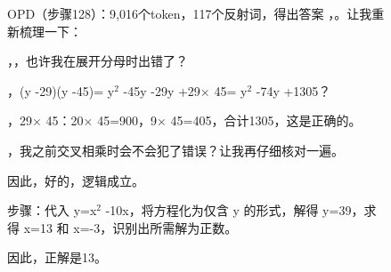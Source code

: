 \begin{figure}[p]
\begin{minipage}[t]{0.495\linewidth}
\begin{opdbox}{OPD（步骤128）：9{,}016个token，117个反射词，得出答案}
，。让我重新梳理一下：


，，也许我在展开分母时出错了？

，(y -29)(y -45)= y$^2$  -45y -29y +29$\times$ 45= y$^2$  -74y +1305？

，29$\times$ 45：20$\times$ 45=900，9$\times$ 45=405，合计1305，这是正确的。

，我之前交叉相乘时会不会犯了错误？让我再仔细核对一遍。


因此，好的，逻辑成立。

步骤：代入 y=x$^2$  -10x，将方程化为仅含 y 的形式，解得 y=39，求得 x=13 和 x=-3，识别出所需解为正数。

因此，正解是13。

\end{opdbox}
\end{minipage}

\label{fig:qual_ds7}
\end{figure}


